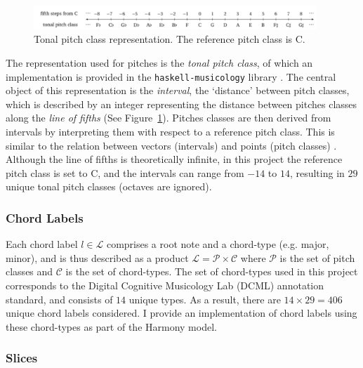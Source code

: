\documentclass[12pt,a4paper,twoside,openany]{report} \usepackage[pdfborder={0 0 0}]{hyperref}    %
\theoremstyle{definition} \newtheorem{definition}{Definition}[section]
\begin{document}
\begin{figure}[ht]
  \begin{center}
    \includegraphics[width=0.95\textwidth]{figs/intro/tpc.png}
  \end{center}
  \caption{Tonal pitch class representation. The reference pitch class is C.}
  \label{fig:tpc}
\end{figure}
The representation used for pitches is the \textit{tonal pitch class}, of which an implementation is provided in the
\texttt{haskell-musicology} library \cite{finkensiepHaskellmusicologyScientificMusic2019}. The central object of this
representation is the \textit{interval}, the `distance' between pitch classes, which is described by an integer
representing the distance between pitches classes
along the \textit{line of fifths} (See Figure~\ref{fig:tpc}). Pitches classes are then derived from intervals by
interpreting them with respect to a reference pitch class.
This is similar to the relation between vectors (intervals) and points (pitch classes)
\cite{finkensiepHaskellmusicologyScientificMusic2019}. Although the line of fifths is theoretically infinite, in this
project the reference pitch class is set to C, and the intervals can range from $-14$ to $14$, resulting in $29$ unique tonal pitch
classes (octaves are ignored).

\subsubsection{Chord Labels}
\label{sub:chordTypes}

Each chord label $l \in \mathcal{L}$ comprises a root note and a chord-type (e.g. major, minor), and is thus described
as a product $\mathcal{L} = \mathcal{P} \times \mathcal{C}$ where $\mathcal{P}$ is the set of pitch classes and $\mathcal{C}$ is the set of chord-types. 
The set of chord-types used in this project corresponds to the Digital Cognitive Musicology Lab (DCML)
annotation standard, and consists of $14$ unique types. As a result, there are $14 \times 29 = 406$ unique chord labels
considered. I provide an implementation of chord labels using these
chord-types as part of the Harmony model.

\subsubsection{Slices}
\label{sub:slices}
\end{document}
